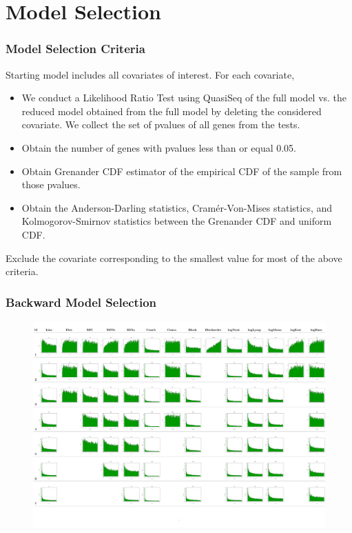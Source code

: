 \documentclass[handout,xcolor=pdftex,dvipsnames,table]{beamer}\usepackage[]{graphicx}\usepackage[]{color}
\begin{document}
\section{Model Selection}
\begin{frame}
\frametitle{Model Selection Criteria}
Starting model includes all  covariates of interest. For each covariate, 
\begin{itemize}
\setlength{\itemsep}{.2in}
\item We conduct a Likelihood Ratio Test using QuasiSeq of the full model vs. the reduced model obtained from the full model by deleting the considered covariate. We collect the set of pvalues of all genes from the tests. 

\item Obtain the number of genes with pvalues less than or equal 0.05. 
\item Obtain Grenander CDF estimator of the empirical CDF of the sample from those pvalues.
\item Obtain the Anderson-Darling statistics, Cram{\'e}r-Von-Mises statistics, and Kolmogorov-Smirnov statistics between the Grenander CDF and uniform CDF.
\end{itemize}
Exclude the covariate corresponding to the smallest value for most of the above criteria.
\end{frame}
\begin{frame}[fragile]
\frametitle{Backward Model Selection}
\begin{figure}[h!]
    \centering
    \includegraphics[width=\textwidth,height=1.4\textheight,keepaspectratio]{Plot07_022014_rficbc.pdf}
    \end{figure}
\end{frame}
\end{document}
